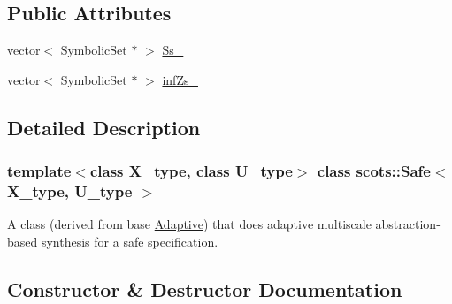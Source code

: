 \subsection*{Public Attributes}
\begin{DoxyCompactItemize}
\item 
vector$<$ Symbolic\+Set $\ast$ $>$ \hyperlink{classscots_1_1Safe_a4c272a1e134f26e88c74a08c2703d934}{Ss\+\_\+}
\item 
vector$<$ Symbolic\+Set $\ast$ $>$ \hyperlink{classscots_1_1Safe_a30e38b9a75a8bf34efb2512465ea9468}{inf\+Zs\+\_\+}
\end{DoxyCompactItemize}


\subsection{Detailed Description}
\subsubsection*{template$<$class X\+\_\+type, class U\+\_\+type$>$\newline
class scots\+::\+Safe$<$ X\+\_\+type, U\+\_\+type $>$}

A class (derived from base \hyperlink{classscots_1_1Adaptive}{Adaptive}) that does adaptive multiscale abstraction-\/based synthesis for a safe specification. 

\subsection{Constructor \& Destructor Documentation}
\mbox{\label{classscots_1_1Safe_a40024a9098c70cebc5842a09b46448b8}} 
